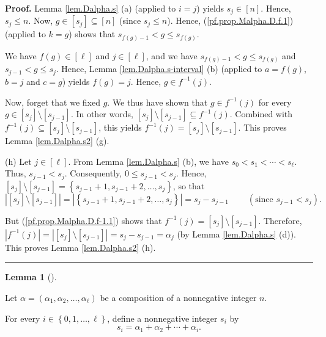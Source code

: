 \documentclass[numbers=enddot,12pt,final,onecolumn,notitlepage,abstracton]{scrartcl}
\theoremstyle{definition}
\newtheorem{lem}[theo]{Lemma}
\newenvironment{lemma}[1][]
{\begin{lem}[#1]\begin{leftbar}}
{\end{leftbar}\end{lem}}
\newenvironment{proof}[1][Proof]{\noindent\textbf{#1.} }{\ \rule{0.5em}{0.5em}}
\newenvironment{verlong}{}{}
\begin{document}
\begin{verlong}
\begin{footnotesize}
\begin{proof}
Lemma \ref{lem.Dalpha.s} (a) (applied to $i=j$) yields $s_{j}\in\left[
n\right]  $. Hence, $s_{j}\leq n$. Now, $g\in\left[  s_{j}\right]
\subseteq\left[  n\right]  $ (since $s_{j}\leq n$). Hence,
(\ref{pf.prop.Malpha.D.f.1}) (applied to $k=g$) shows that $s_{f\left(
g\right)  -1}<g\leq s_{f\left(  g\right)  }$.

We have $f\left(  g\right)  \in\left[  \ell\right]  $ and $j\in\left[
\ell\right]  $, and we have $s_{f\left(  g\right)  -1}<g\leq s_{f\left(
g\right)  }$ and $s_{j-1}<g\leq s_{j}$. Hence, Lemma
\ref{lem.Dalpha.s-interval} (b) (applied to $a=f\left(  g\right)  $, $b=j$ and
$c=g$) yields $f\left(  g\right)  =j$. Hence, $g\in f^{-1}\left(  j\right)  $.

Now, forget that we fixed $g$. We thus have shown that $g\in f^{-1}\left(
j\right)  $ for every $g\in\left[  s_{j}\right]  \setminus\left[
s_{j-1}\right]  $. In other words, $\left[  s_{j}\right]  \setminus\left[
s_{j-1}\right]  \subseteq f^{-1}\left(  j\right)  $. Combined with
$f^{-1}\left(  j\right)  \subseteq\left[  s_{j}\right]  \setminus\left[
s_{j-1}\right]  $, this yields $f^{-1}\left(  j\right)  =\left[  s_{j}\right]
\setminus\left[  s_{j-1}\right]  $. This proves Lemma \ref{lem.Dalpha.s2} (g).

(h) Let $j\in\left[  \ell\right]  $. From Lemma \ref{lem.Dalpha.s} (b), we
have $s_{0}<s_{1}<\cdots<s_{\ell}$. Thus, $s_{j-1}<s_{j}$. Consequently,
$0\leq s_{j-1}<s_{j}$. Hence, $\left[  s_{j}\right]  \setminus\left[
s_{j-1}\right]  =\left\{  s_{j-1}+1,s_{j-1}+2,\ldots,s_{j}\right\}  $, so that%
\[
\left\vert \left[  s_{j}\right]  \setminus\left[  s_{j-1}\right]  \right\vert
=\left\vert \left\{  s_{j-1}+1,s_{j-1}+2,\ldots,s_{j}\right\}  \right\vert
=s_{j}-s_{j-1}\ \ \ \ \ \ \ \ \ \ \left(  \text{since }s_{j-1}<s_{j}\right)
.
\]


But (\ref{pf.prop.Malpha.D.f-1.1}) shows that $f^{-1}\left(  j\right)
=\left[  s_{j}\right]  \setminus\left[  s_{j-1}\right]  $. Therefore,
$\left\vert f^{-1}\left(  j\right)  \right\vert =\left\vert \left[
s_{j}\right]  \setminus\left[  s_{j-1}\right]  \right\vert =s_{j}%
-s_{j-1}=\alpha_{j}$ (by Lemma \ref{lem.Dalpha.s} (d)). This proves Lemma
\ref{lem.Dalpha.s2} (h).
\end{proof}

\begin{lemma}
\label{lem.Dalpha.ItoJ}Let $\alpha=\left(  \alpha_{1},\alpha_{2},\ldots
,\alpha_{\ell}\right)  $ be a composition of a nonnegative integer $n$.

For every $i\in\left\{  0,1,\ldots,\ell\right\}  $, define a nonnegative
integer $s_{i}$ by
\[
s_{i}=\alpha_{1}+\alpha_{2}+\cdots+\alpha_{i}.
\]



\end{lemma}
\end{footnotesize}
\end{verlong}
\end{document}
